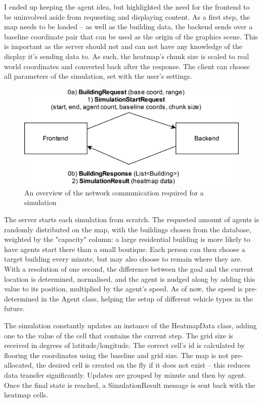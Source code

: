 I ended up keeping the agent idea, but highlighted the need for the frontend to be uninvolved aside from requesting and displaying content. As a first step, the map needs to be loaded -- as well as the building data, the backend sends over a baseline coordinate pair that can be used as the origin of the graphics scene. This is important as the server should not and can not have any knowledge of the display it's sending data to. As such, the heatmap's chunk size is scaled to real world coordinates and converted back after the response. The client can choose all parameters of the simulation, set with the user's settings.
\begin{figure}[h]
    \centering
    \includegraphics[width=140mm, keepaspectratio]{images/simu_network.png}
    \caption{An overview of the network communication required for a simulation\ \label{simu_network}}
\end{figure}

The server starts each simulation from scratch. The requested amount of agents is randomly distributed on the map, with the buildings chosen from the database, weighted by the "capacity" column: a large residential building is more likely to have agents start there than a small boutique. Each person can then choose a target building every minute, but may also choose to remain where they are. With a resolution of one second, the difference between the goal and the current location is determined, normalised, and the agent is nudged along by adding this value to its position, multiplied by the agent's speed. As of now, the speed is pre-determined in the Agent class, helping the setup of different vehicle types in the future.

The simulation constantly updates an instance of the HeatmapData class, adding one to the value of the cell that contains the current step. The grid size is received in degrees of latitude/longitude. The correct cell's id is calculated by flooring the coordinates using the baseline and grid size. The map is not pre-allocated, the desired cell is created on the fly if it does not exist -- this reduces data transfer significantly. Updates are grouped by minute and then by agent. Once the final state is reached, a SimulationResult message is sent back with the heatmap cells.

